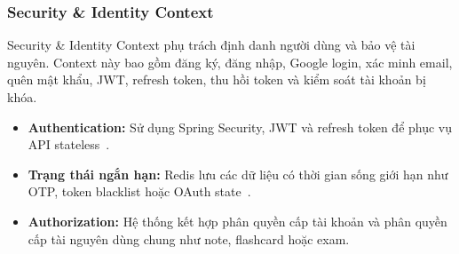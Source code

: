 \subsubsection{Security \& Identity Context}
\label{subsubsec:security-context}

Security \& Identity Context phụ trách định danh người dùng và bảo vệ tài nguyên. Context này bao gồm đăng ký, đăng nhập, Google login, xác minh email, quên mật khẩu, JWT, refresh token, thu hồi token và kiểm soát tài khoản bị khóa.

\begin{itemize}
    \item \textbf{Authentication:} Sử dụng Spring Security, JWT và refresh token để phục vụ API stateless~\cite{springsecurityjwt}.
    \item \textbf{Trạng thái ngắn hạn:} Redis lưu các dữ liệu có thời gian sống giới hạn như OTP, token blacklist hoặc OAuth state~\cite{redisoverview}.
    \item \textbf{Authorization:} Hệ thống kết hợp phân quyền cấp tài khoản và phân quyền cấp tài nguyên dùng chung như note, flashcard hoặc exam.
\end{itemize}
